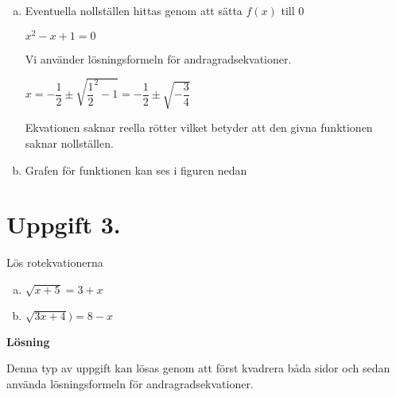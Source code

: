 \documentclass{article}
\begin{document}
\begin{enumerate}[(a)]
\item 
Eventuella nollställen hittas genom att sätta $f(x)$ till $0$

$x^2-x+1=0$

Vi använder lösningsformeln för andragradsekvationer.

$x=-\dfrac{1}{2}\pm\sqrt{\dfrac{1}{2}^2-1}=-\dfrac{1}{2}\pm\sqrt{-\dfrac{3}{4}}$

Ekvationen saknar reella rötter vilket betyder att den givna funktionen saknar nollställen.

\item Grafen för funktionen kan ses i figuren nedan


\end{enumerate}

\section*{Uppgift 3.}
Lös rotekvationerna
\begin{enumerate}[(a)]
\item $\sqrt{x+5}=3+x$
\item $\sqrt{3x+4})=8-x$
\end{enumerate}

\textbf{Lösning}

Denna typ av uppgift kan lösas genom att först kvadrera båda sidor och sedan använda lösningsformeln för andragradsekvationer.
\end{document}
